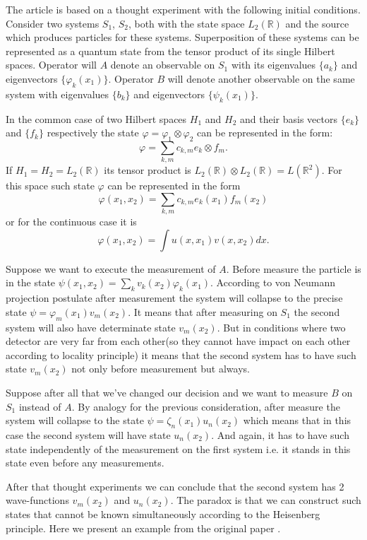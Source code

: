 \documentclass[11pt]{article}
\begin{document}
The article is based on a thought experiment with the following initial conditions. Consider two systems $S_1$, $S_2$, both with the state space $L_2(\mathbb{R})$ and the source which produces particles for these systems. Superposition of these systems can be represented as a quantum state from the tensor product of its single Hilbert spaces.
Operator will $A$ denote an observable on $S_1$ with its eigenvalues $\{a_k\}$ and eigenvectors $\{\varphi_k(x_1)\}$. Operator $B$ will denote another observable on the same system with eigenvalues $\{b_k\}$ and eigenvectors $\{\psi_k(x_1)\}$. 

In the common case of two Hilbert spaces $H_1$ and $H_2$ and their basis vectors $\{e_k\}$ and $\{f_k\}$ respectively the state $\varphi = \varphi_1\otimes\varphi_2$ can be represented in the form:
\[
\varphi = \sum_{k, m}c_{k, m}e_k\otimes f_m.
\]
If $H_1 = H_2 = L_2(\mathbb{R})$ its tensor product is $L_2(\mathbb{R})\otimes L_2(\mathbb{R}) = L(\mathbb{R}^2)$. For this space such state $\varphi$ can be represented in the form
\[
\varphi (x_1, x_2) = \sum_{k, m}c_{k, m}e_k(x_1)f_m(x_2)
\]
or for the continuous case it is
\[
\varphi (x_1, x_2) = \int u(x, x_1)v(x, x_2)dx.
\]

Suppose we want to execute the measurement of $A$. Before measure the particle is in the state $\psi(x_1, x_2) = \sum_k v_k(x_2)\varphi_k(x_1)$. According to von Neumann projection postulate after measurement the system will collapse to the precise state $\psi = \varphi_m(x_1)v_m(x_2)$. It means that after measuring on $S_1$ the second system will also have determinate state $v_m(x_2)$. But in conditions where two detector are very far from each other(so they cannot have impact on each other according to locality principle) it means that the second system has to have such state $v_m(x_2)$ not only before measurement but always.

Suppose after all that we've changed our decision and we want to measure $B$ on $S_1$ instead of $A$. By analogy for the previous consideration, after measure the system will collapse to the state $\psi = \zeta_n(x_1)u_n(x_2)$ which means that in this case the second system will have state $u_n(x_2)$. And again, it has to have such state independently of the measurement on the first system i.e. it stands in this state even before any measurements.

After that thought experiments we can conclude that the second system has 2 wave-functions $v_m(x_2)$ and $u_n(x_2)$. The paradox is that we can construct such states that cannot be known simultaneously according to the Heisenberg principle. Here we present an example from the original paper \cite{EPR}.
\end{document}
